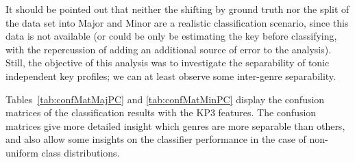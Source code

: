 \documentclass{article}
\begin{document}
It should be pointed out that neither the shifting by ground truth nor the split of the data set into Major and Minor are a realistic classification scenario, since this data is not available (or could be only be estimating the key before classifying, with the repercussion of adding an additional source of error to the analysis). 
Still, the objective of this analysis was to investigate the separability of tonic independent key profiles; we can at least observe some inter-genre separability.



Tables~\ref{tab:confMatMajPC} and \ref{tab:confMatMinPC} display the confusion matrices of the classification results with the KP3 features. The confusion matrices give more detailed insight which genres are more separable than others, and also allow some insights on the classifier performance in the case of non-uniform class distributions.


\end{document}
